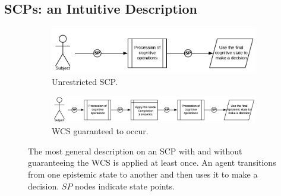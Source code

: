 \documentclass{article}
\begin{document}
\subsection{SCPs: an Intuitive Description}
\begin{figure}
\begin{subfigure}{.4\textwidth}
  \centering
  \includegraphics[width=.95\linewidth]{general}
  \caption{Unrestricted SCP.}
  \label{fig:scp_general}
\end{subfigure}%
\begin{subfigure}{.6\textwidth}
  \centering
  \includegraphics[width=.95\linewidth]{generalWCS}
  \caption{WCS guaranteed to occur.}
  \label{fig:sfig2}
\end{subfigure}
\caption{The most general description on an SCP with and without guaranteeing the WCS is applied at least once. An agent transitions from one epistemic state to another and then uses it to make a decision. $SP$ nodes indicate state points.}
\label{fig:scp_generalWCS}
\end{figure}
\end{document}
